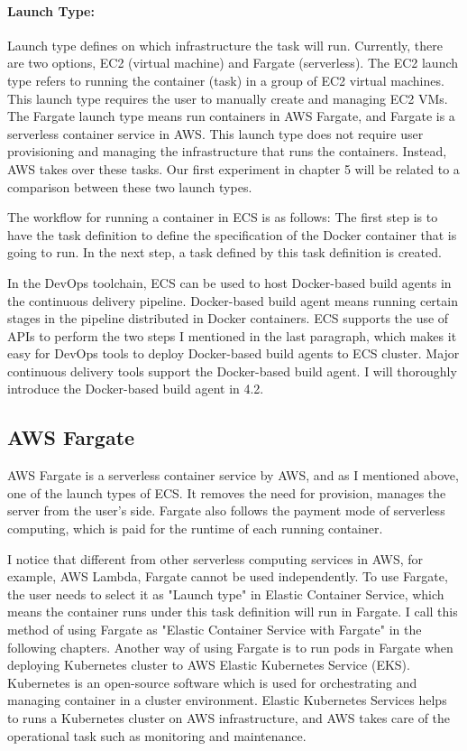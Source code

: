 \paragraph{Launch Type:} Launch type defines on which infrastructure the task will run. Currently, there are two options, EC2 (virtual machine) and Fargate (serverless). The EC2 launch type refers to running the container (task) in a group of EC2 virtual machines. This launch type requires the user to manually create and managing EC2 VMs. The Fargate launch type means run containers in AWS Fargate, and Fargate is a serverless container service in AWS. This launch type does not require user provisioning and managing the infrastructure that runs the containers. Instead, AWS takes over these tasks. Our first experiment in chapter 5 will be related to a comparison between these two launch types.
\par
The workflow for running a container in ECS is as follows:
The first step is to have the task definition to define the specification of the Docker container that is going to run. In the next step, a task defined by this task definition is created.
\par
In the DevOps toolchain, ECS can be used to host Docker-based build agents in the continuous delivery pipeline. Docker-based build agent means running certain stages in the pipeline distributed in Docker containers. 
ECS supports the use of APIs to perform the two steps I mentioned in the last paragraph, which makes it easy for DevOps tools to deploy Docker-based build agents to ECS cluster.
Major continuous delivery tools support the Docker-based build agent. 
I will thoroughly introduce the Docker-based build agent in 4.2.
\subsection{AWS Fargate}
AWS Fargate is a serverless container service by AWS, and as I mentioned above, one of the launch types of ECS. It removes the need for provision, manages the server from the user's side. Fargate also follows the payment mode of serverless computing, which is paid for the runtime of each running container. 
\par
I notice that different from other serverless computing services in AWS, for example, AWS Lambda, Fargate cannot be used independently. To use Fargate, the user needs to select it as "Launch type" in Elastic Container Service, which means the container runs under this task definition will run in Fargate. I call this method of using Fargate as "Elastic Container Service with Fargate" in the following chapters. Another way of using Fargate is to run pods in Fargate when deploying Kubernetes cluster to AWS Elastic Kubernetes Service (EKS). Kubernetes is an open-source software which is used for orchestrating and managing container in a cluster environment. Elastic Kubernetes Services helps to runs a Kubernetes cluster on AWS infrastructure, and AWS takes care of the operational task such as monitoring and maintenance. 
